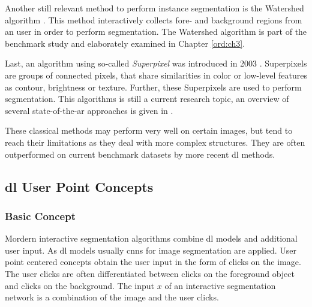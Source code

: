 Another still relevant method to perform instance segmentation is the Watershed algorithm \cite{NS94-Watershed}.
This method interactively collects fore- and background regions from an user in order to perform segmentation.
The Watershed algorithm is part of the benchmark study and elaborately examined in Chapter \ref{ord:ch3}.

Last, an algorithm using so-called \textit{Superpixel} was introduced in 2003 \cite{RM03-Superpixel}.
Superpixels are groups of connected pixels, that share similarities in color or low-level features as contour, brightness or texture.
Further, these Superpixels are used to perform segmentation.
This algorithms is still a current research topic, an overview of several state-of-the-ar approaches is given in \cite{SHL16-SuperpixelEvaluation}.
 
These classical methods may perform very well on certain images, but tend to reach their limitations as they deal with more complex structures.
They are often outperformed on current benchmark datasets by more recent \gls{dl} methods.


\subsection{\gls{dl} User Point Concepts}\label{ord:ch2:sec3:subsec2}

\subsubsection{Basic Concept}
Mordern interactive segmentation algorithms combine \gls{dl} models and additional user input.
As \gls{dl} models usually \glspl{cnn} for image segmentation are applied.
User point centered concepts obtain the user input in the form of clicks on the image.
The user clicks are often differentiated between clicks on the foreground object and clicks on the background.
The input $x$ of an interactive segmentation network is a combination of the image and the user clicks.

